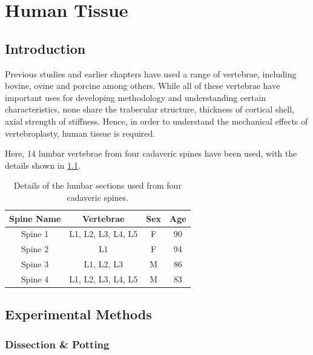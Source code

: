 \chapter{Human Tissue} \label{Chapter_HT}

\section{Introduction}

Previous studies and earlier chapters have used a range of vertebrae, including bovine, ovine and porcine among others. While all of these vertebrae have important uses for developing methodology and understanding certain characteristics, none share the trabecular structure, thickness of cortical shell, axial strength of stiffness. Hence, in order to understand the mechanical effects of vertebroplasty, human tissue is required.

Here, 14 lumbar vertebrae from four cadaveric spines have been used, with the details shown in \cref{tab:vertebrae}.

\begin{table}[ht!]
\centering
  \caption{Details of the lumbar sections used from four cadaveric spines.}
  \label{tab:vertebrae}
  \begin{tabular}{c|c|c|c}
    Spine Name & Vertebrae & Sex & Age \\ \hline \hline
    Spine 1& L1, L2, L3, L4, L5 & F & 90\\ \hline
    Spine 2& L1 & F & 94\\ \hline
    Spine 3& L1, L2, L3 & M & 86\\ \hline
    Spine 4& L1, L2, L3, L4, L5 & M & 83\\ \hline

  \end{tabular}

\end{table}


\section{Experimental Methods}

\subsection{Dissection \& Potting}


